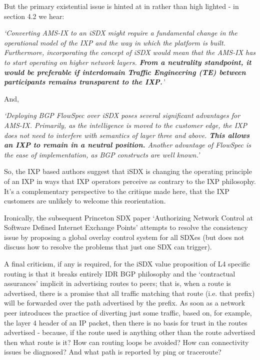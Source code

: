 But the primary existential issue is hinted at in \cite{hermans2016}rather than high lighted - in section 4.2 we hear:


\textit{`Converting AMS-IX to an iSDX might require a fundamental change in the operational model of the IXP and the way in which the platform is built. Furthermore, incorporating the concept of iSDX would mean that the AMS-IX has to start operating on higher network layers. \textbf{From a neutrality standpoint, it would be preferable if interdomain Traﬃc Engineering (TE) between participants remains transparent to the IXP.}'}


And,

\textit{`Deploying BGP FlowSpec over iSDX poses several signiﬁcant advantages for AMS-IX. Primarily, as the intelligence is moved to the customer edge, the IXP does not need to interfere with semantics of layer three and above. \textbf{This allows an IXP to remain in a neutral position.} Another advantage of FlowSpec is the ease of implementation, as BGP constructs are well known.'}

So, the IXP based authors suggest that iSDX is changing the operating principle of an IXP in ways that IXP operators perceive as contrary to the IXP philosophy.   It's a complementary perspective to the critique made here, that the IXP customers are unlikely to welcome this reorientation. 


Ironically, the subsequent Princeton SDX paper `Authorizing Network Control at Software Defined Internet Exchange Points' \cite{Gupta2016a} attempts to resolve the consistency issue by proposing a global overlay control system for all SDXes (but does not discuss how to resolve the problems that just one SDX can trigger).


A final criticism, if any is required, for the iSDX value proposition of L4 specific routing is that it breaks entirely IDR BGP philosophy and the `contractual assurances' implicit in advertising routes to peers; that is, when a route is advertised, there is a promise that all traffic matching that route (i.e. that prefix) will be forwarded over the path advertised by the prefix.   As soon as a network peer introduces the practice of diverting just some traffic, based on, for example, the layer 4 header of an IP packet, then there is no basis for trust in the routes advertised - because, if the route used is anything other than the route advertised then what route is it? How can routing loops be avoided?  How can connectivity issues be diagnosed?  And what path is reported by ping or traceroute?

